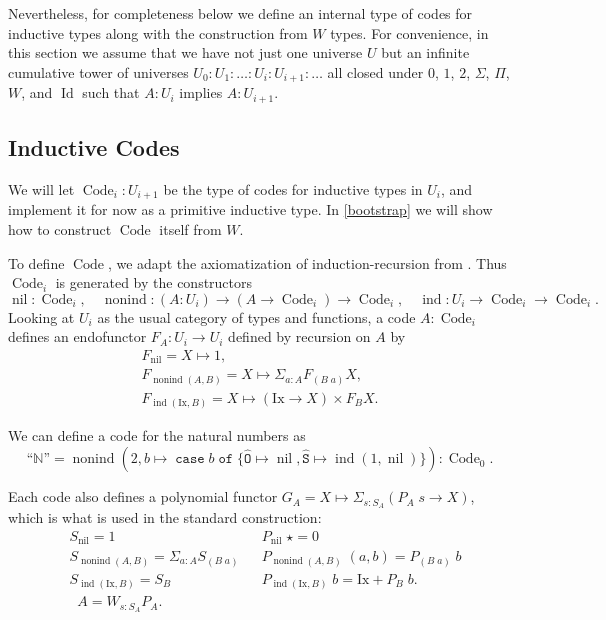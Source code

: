 \documentclass[a4paper,UKenglish,cleveref,nameinlink,autoref,thm-restate]{lipics-v2019}
\newcommand{\zero}{0}
\newcommand{\one}{1}
\newcommand{\bool}{2}
\newcommand{\codeO}{\mathtt{\hat{O}}}
\newcommand{\codeS}{\mathtt{\hat{S}}}
\newcommand{\N}{\hyperref[define-N]{\mathbb{N}}}
\DeclareMathOperator{\case}{\mathtt{case}}
\newcommand{\caset}[2]{\case {#1}\;\mathtt{of}\;\{{#2}\}}
\DeclareMathOperator{\Idop}{\mathrm{Id}}
\DeclareMathOperator{\nonind}{nonind}
\DeclareMathOperator{\ind}{ind}
\DeclareMathOperator{\nil}{nil}
\DeclareMathOperator{\Code}{Code}
\newcommand{\Ix}{\mathrm{Ix}}
\DeclareMathOperator{\preEl}{\tilde{El}}
\begin{document}
Nevertheless, for completeness below we define an internal type of codes for inductive types along with the construction from $W$ types. For convenience, in this section we assume that we have not just one universe $U$ but an infinite cumulative tower of universes $U_0 : U_1 : \dots : U_i : U_{i+1} : \dots$ all closed under $\zero$, $\one$, $\bool$, $\Sigma$, $\Pi$, $W$, and $\Idop$ such that $A : U_i$ implies $A : U_{i+1}$.

\subsection{Inductive Codes}
We will let $\Code_i : U_{i+1}$ be the type of codes for inductive types in $U_i$, and implement it for now as a primitive inductive type. In \cref{bootstrap} we will show how to construct $\Code$ itself from $W$.

To define $\Code$, we adapt the axiomatization of induction-recursion from \cite{finite-axiom-IR}. Thus $\Code_i$ is generated by the constructors
\[\nil : \Code_i,\quad \nonind : (A : U_i) \to (A \to \Code_i) \to \Code_i, \quad \ind : U_i \to \Code_i \to \Code_i.\]
Looking at $U_i$ as the usual category of types and functions, a code $A : \Code_i$ defines an endofunctor $F_A : U_i \to U_i$ defined by recursion on $A$ by
\begin{gather}
F_{\nil} = X \mapsto \one,\\
F_{\nonind(A,B)} = X \mapsto \Sigma_{a : A} F_{(B\;a)} X,\\
F_{\ind(\Ix, B)} = X \mapsto (\Ix \to X) \times F_{B} X.
\end{gather}

\begin{example}We can define a code for the natural numbers as \[\text{``$\N$''} = \nonind(2, b \mapsto \caset{b}{\codeO \mapsto \nil, \codeS\mapsto \ind(1, \nil)}) : \Code_0.\]
\end{example}

Each code also defines a polynomial functor $G_A = X \mapsto \Sigma_{s : S_A} (P_A\;s \to X)$, which is what is used in the standard construction:
\begin{align}
&S_{\nil} = 1 & &P_{\nil}\;\star = 0\\
&S_{\nonind(A,B)} = \Sigma_{a : A} S_{(B\;a)} & &P_{\nonind(A, B)}\;(a,b) = P_{(B\;a)}\;b \\
&S_{\ind(\Ix, B)} = S_B & &P_{\ind(\Ix, B)}\;b = \Ix + P_B\;b.\\
&\preEl A = W_{s : S_A}P_A.
\end{align}
\end{document}

